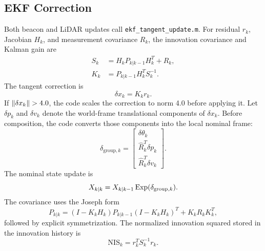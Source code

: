 \subsection{EKF Correction}

Both beacon and LiDAR updates call \texttt{ekf\_tangent\_update.m}. For residual \(r_k\), Jacobian \(H_k\), and measurement covariance \(R_k\), the innovation covariance and Kalman gain are
\begin{align}
    S_k &= H_kP_{k|k-1}H_k^T+R_k,\\
    K_k &= P_{k|k-1}H_k^T S_k^{-1}.
\end{align}
The tangent correction is
\begin{equation}
    \delta x_k=K_k r_k.
\end{equation}
If \(\left\lVert \delta x_k \right\rVert>4.0\), the code scales the correction to norm 4.0 before applying it. Let \(\delta p_k\) and \(\delta v_k\) denote the world-frame translational components of \(\delta x_k\). Before composition, the code converts those components into the local nominal frame:
\begin{equation}
    \delta_{\mathrm{group},k}=
    \begin{bmatrix}
    \delta \theta_k\\
    \hat{R}_k^T\delta p_k\\
    \hat{R}_k^T\delta v_k
    \end{bmatrix}.
\end{equation}
The nominal state update is
\begin{equation}
    X_{k|k}=X_{k|k-1}\operatorname{Exp}(\delta_{\mathrm{group},k}).
\end{equation}
The covariance uses the Joseph form
\begin{equation}
P_{k|k}
=
(I-K_kH_k)P_{k|k-1}(I-K_kH_k)^T
+K_kR_kK_k^T,
\end{equation}
followed by explicit symmetrization. The normalized innovation squared stored in the innovation history is
\begin{equation}
    \mathrm{NIS}_k=r_k^T S_k^{-1}r_k.
\end{equation}
